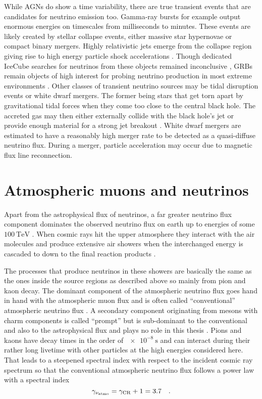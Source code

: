 While AGNs do show a time variability, there are true transient events that are candidates for neutrino emission too.
Gamma-ray bursts for example output enormous energies on timescales from milliseconds to minutes.
These events are likely created by stellar collapse events, either massive star hypernovae or compact binary mergers.
Highly relativistic jets emerge from the collapse region giving rise to high energy particle shock accelerations .
Though dedicated IceCube searches for neutrinos from these objects remained inconclusive , GRBs remain objects of high interest for probing neutrino production in most extreme environments .
Other classes of transient neutrino sources may be tidal disruption events or white dwarf mergers.
The former being stars that get torn apart by gravitational tidal forces when they come too close to the central black hole.
The accreted gas may then either externally collide with the black hole's jet or provide enough material for a strong jet breakout .
White dwarf mergers are estimated to have a reasonably high merger rate to be detected as a quasi-diffuse neutrino flux.
During a merger, particle acceleration may occur due to magnetic flux line reconnection.


\section{Atmospheric muons and neutrinos}
Apart from the astrophysical flux of neutrinos, a far greater neutrino flux component dominates the observed neutrino flux on earth up to energies of some $\SI{100}{\TeV}$ .
When cosmic rays hit the upper atmosphere they interact with the air molecules and produce extensive air showers when the interchanged energy is cascaded to down to the final reaction products .

The processes that produce neutrinos in these showers are basically the same as the ones inside the source regions as described above so mainly from pion and kaon decay.
The dominant component of the atmospheric neutrino flux goes hand in hand with the atmospheric muon flux and is often called \enquote{conventional} atmospheric neutrino flux .
A secondary component originating from mesons with charm components is called \enquote{prompt} but is sub-dominant to the conventional and also to the astrophysical flux and plays no role in this thesis .
Pions and kaons have decay times in the order of $\SI{e-8}{\s}$ and can interact during their rather long livetime with other particles at the high energies considered here.
That leads to a steepened spectral index with respect to the incident cosmic ray spectrum so that the conventional atmospheric neutrino flux follows a power law with a spectral index 
\begin{equation}
  \gamma_{\nu_\text{atmo}} = \gamma_\text{CR} + 1 = 3.7
  \quad\text{.}
\end{equation}